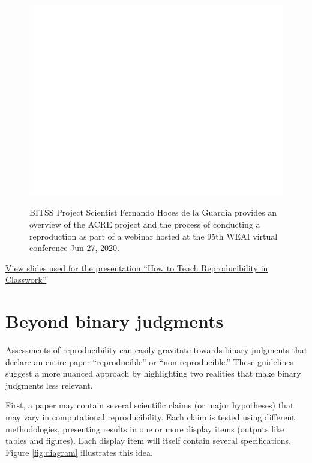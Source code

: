 \documentclass[]{book}
\begin{document}
\begin{figure}
\href{https://www.youtube.com/embed/Xv1t8An2gPo}{\includegraphics[width=1\linewidth]{ACRE_book_files/figure-latex/weai-presentation-1} }\caption{BITSS Project Scientist Fernando Hoces de la Guardia provides an overview of the ACRE project and the process of conducting a reproduction as part of a webinar hosted at the 95th WEAI virtual conference Jun 27, 2020.}\label{fig:weai-presentation}
\end{figure}

\href{https://bitss.github.io/WEAI2020_slides/}{View slides used for the presentation ``How to Teach Reproducibility in Classwork''}

\hypertarget{beyond-binary-judgments}{%
\section*{Beyond binary judgments}\label{beyond-binary-judgments}}

Assessments of reproducibility can easily gravitate towards binary judgments that declare an entire paper ``reproducible'' or ``non-reproducible.'' These guidelines suggest a more nuanced approach by highlighting two realities that make binary judgments less relevant.

First, a paper may contain several scientific claims (or major hypotheses) that may vary in computational reproducibility. Each claim is tested using different methodologies, presenting results in one or more display items (outputs like tables and figures). Each display item will itself contain several specifications. Figure \ref{fig:diagram} illustrates this idea.
\end{document}
